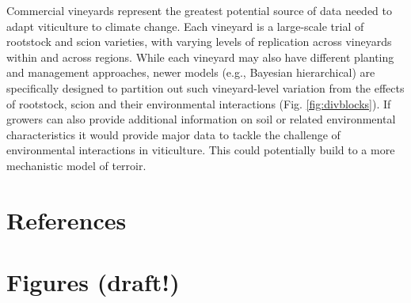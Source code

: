 \documentclass[11pt]{article}
\begin{document}
Commercial vineyards represent the greatest potential source of data needed to adapt viticulture to climate change. Each vineyard is a large-scale trial of rootstock and scion varieties, with varying levels of replication across vineyards within and across regions. While each vineyard may also have different planting and management approaches, newer models (e.g., Bayesian hierarchical) are specifically designed to partition out such vineyard-level variation from the effects of rootstock, scion and their environmental interactions (Fig. \ref{fig:divblocks}). If growers can also provide additional information on soil or related environmental characteristics it would provide major data to tackle the challenge of environmental interactions in viticulture. This could potentially build to a more mechanistic model of terroir. 

\section{References}



\clearpage
\section{Figures (draft!)}

\end{document}
